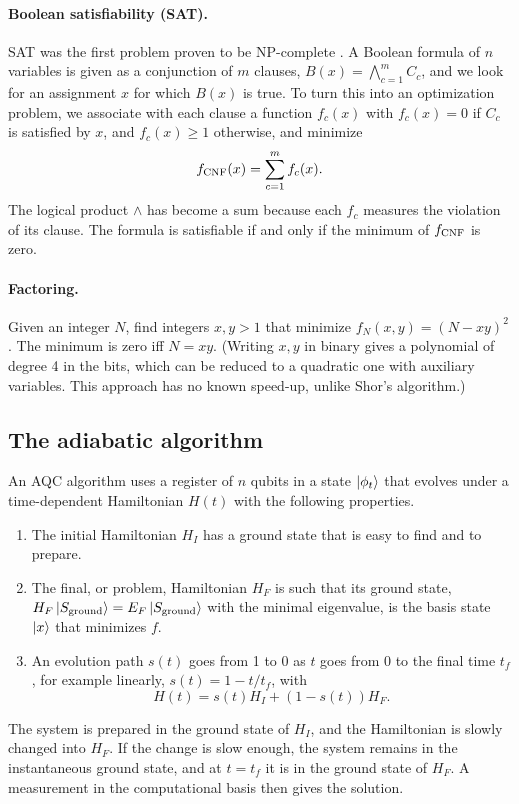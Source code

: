 \paragraph{Boolean satisfiability (SAT).} SAT was the first problem proven to be NP-complete \cite{Cook1971}. A Boolean formula of $n$ variables is given as a conjunction of $m$ clauses, $B(x)=\bigwedge_{c=1}^mC_c$, and we look for
an assignment $x$ for which $B(x)$ is true. To turn this into an optimization problem, we associate with each clause a function $f_c(x)$ with $f_c(x)=0$ if $C_c$ is satisfied by $x$, and $f_c(x)\ge1$ otherwise, and minimize
\begin{equation}
  f_{\rm CNF}(x)=\sum_{c=1}^mf_c(x).
\end{equation}
The logical product $\wedge$ has become a sum because each $f_c$ measures the violation of its clause. The formula is satisfiable if and only if the minimum of $f_{\rm CNF}$ is zero.

\paragraph{Factoring.} Given an integer $N$, find integers $x,y>1$ that minimize $f_N(x,y)=(N-xy)^2$. The minimum is zero iff $N=xy$. (Writing $x,y$ in binary gives a polynomial of degree 4 in the bits, which can be reduced to
a quadratic one with auxiliary variables. This approach has no known speed-up, unlike Shor's algorithm.)

\subsection{The adiabatic algorithm}
An AQC algorithm uses a register of $n$ qubits in a state $\left|\phi_t\right\rangle$ that evolves under a time-dependent Hamiltonian $H(t)$ with the following properties.
\begin{enumerate}
  \item The initial Hamiltonian $H_I$ has a ground state that is easy to find and to prepare.
  \item The final, or problem, Hamiltonian $H_F$ is such that its ground state, $H_F\left|S_{\rm ground}\right\rangle=E_F\left|S_{\rm ground}\right\rangle$ with the minimal eigenvalue, is the basis state $\left|x\right\rangle$ that minimizes $f$.
  \item An evolution path $s(t)$ goes from 1 to 0 as $t$ goes from 0 to the final time $t_f$, for example linearly, $s(t)=1-t/t_f$, with
  \begin{equation}
    H(t)=s(t)H_I+\left(1-s(t)\right)H_F .
  \end{equation}
\end{enumerate}
The system is prepared in the ground state of $H_I$, and the Hamiltonian is slowly changed into $H_F$. If the change is slow enough, the system remains in the instantaneous ground state, and at $t=t_f$ it is in the ground state of $H_F$.
A measurement in the computational basis then gives the solution.

